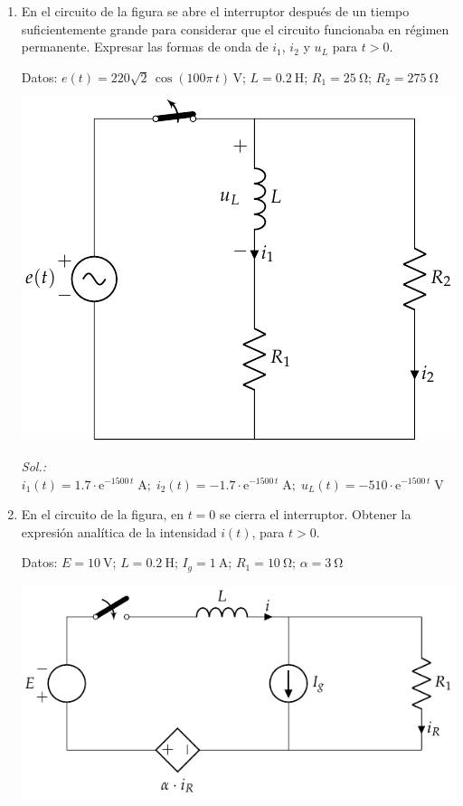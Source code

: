 \begin{enumerate}
\item En el circuito de la figura se abre el interruptor después de un
  tiempo suficientemente grande para considerar que el circuito
  funcionaba en régimen permanente. Expresar las formas de onda de
  $i_1$, $i_2$ y $u_L$ para $t>0$.

  Datos:\; $e(t)=220\sqrt{2}\,\cos(100\pi\,t)\,\unit{\volt}$;\;
  $L = \qty{0.2}{\henry}$;\; $R_1 = \qty{25}{\ohm}$;\;
  $R_2 = \qty{275}{\ohm}$

  \begin{center}
    \includegraphics{../figs/BT4_05.pdf}
  \end{center}

  \emph{Sol.:\;
    $i_1(t)=1.7\cdot\mathrm{e}^{-1500\,t}\;\si{\ampere};\; i_2(t)=-1.7\cdot\mathrm{e}^{-1500\,t}\;\si{\ampere};\;
    u_L(t)=-510\cdot\mathrm{e}^{-1500\,t}\;\si{\volt}$}

\item En el circuito de la figura, en $t = 0$ se cierra el
  interruptor. Obtener la expresión analítica de la intensidad $i(t)$,
  para $t > 0$.

  Datos:\; $E = \qty{10}{\volt}$;\; $L = \qty{0.2}{\henry}$;\;
  $I_g = \qty{1}{\ampere}$;\; $R_1 = \qty{10}{\ohm}$;\;
  $\alpha = \qty{3}{\ohm}$

  \begin{center}
    \includegraphics{../figs/BT4_06.pdf}
  \end{center}


\end{enumerate}
